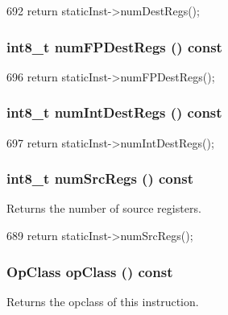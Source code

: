 \begin{DoxyCode}
692 { return staticInst->numDestRegs(); }
\end{DoxyCode}
\hypertarget{classInOrderDynInst_a7ec0ad00d322ae83bc5fae443ef04323}{
\subsubsection[{numFPDestRegs}]{\setlength{\rightskip}{0pt plus 5cm}int8\_\-t numFPDestRegs () const}}
\label{classInOrderDynInst_a7ec0ad00d322ae83bc5fae443ef04323}



\begin{DoxyCode}
696 { return staticInst->numFPDestRegs(); }
\end{DoxyCode}
\hypertarget{classInOrderDynInst_a3935410f8201e0afd0f8e459f838b463}{
\subsubsection[{numIntDestRegs}]{\setlength{\rightskip}{0pt plus 5cm}int8\_\-t numIntDestRegs () const}}
\label{classInOrderDynInst_a3935410f8201e0afd0f8e459f838b463}



\begin{DoxyCode}
697 { return staticInst->numIntDestRegs(); }
\end{DoxyCode}
\hypertarget{classInOrderDynInst_a3902ecc708a6f28e94ee9aa975692915}{
\subsubsection[{numSrcRegs}]{\setlength{\rightskip}{0pt plus 5cm}int8\_\-t numSrcRegs () const}}
\label{classInOrderDynInst_a3902ecc708a6f28e94ee9aa975692915}
Returns the number of source registers. 


\begin{DoxyCode}
689 { return staticInst->numSrcRegs(); }
\end{DoxyCode}
\hypertarget{classInOrderDynInst_aa4919f97cae20d4d82391c1fc6d5fda6}{
\subsubsection[{opClass}]{\setlength{\rightskip}{0pt plus 5cm}OpClass opClass () const}}
\label{classInOrderDynInst_aa4919f97cae20d4d82391c1fc6d5fda6}
Returns the opclass of this instruction. 


